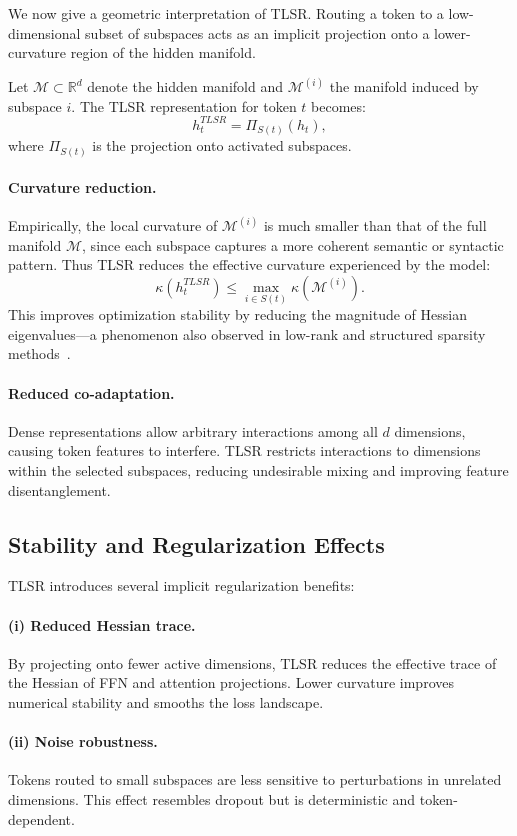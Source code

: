 \documentclass{article}
\theoremstyle{plain}
\theoremstyle{definition}
\theoremstyle{remark}
\begin{document}
We now give a geometric interpretation of TLSR.
Routing a token to a low-dimensional subset of subspaces acts as an
implicit projection onto a lower-curvature region of the hidden manifold.

Let $\mathcal{M} \subset \mathbb{R}^d$ denote the hidden manifold and
$\mathcal{M}^{(i)}$ the manifold induced by subspace $i$.
The TLSR representation for token $t$ becomes:
\[
h_t^{TLSR} = \Pi_{S(t)}(h_t),
\]
where $\Pi_{S(t)}$ is the projection onto activated subspaces.

\paragraph{Curvature reduction.}
Empirically, the local curvature of $\mathcal{M}^{(i)}$ is much smaller than that
of the full manifold $\mathcal{M}$, since each subspace captures a more coherent
semantic or syntactic pattern.
Thus TLSR reduces the effective curvature experienced by the model:
\[
\kappa(h_t^{TLSR}) \le \max_{i \in S(t)} \kappa(\mathcal{M}^{(i)}).
\]
This improves optimization stability by reducing the magnitude of
Hessian eigenvalues—a phenomenon also observed in low-rank
and structured sparsity methods~\cite{fang2024maskllm,zheng2024readme}.

\paragraph{Reduced co-adaptation.}
Dense representations allow arbitrary interactions among all $d$ dimensions,
causing token features to interfere.
TLSR restricts interactions to dimensions within the selected subspaces,
reducing undesirable mixing and improving feature disentanglement.

\subsection{Stability and Regularization Effects}

TLSR introduces several implicit regularization benefits:

\paragraph{(i) Reduced Hessian trace.}
By projecting onto fewer active dimensions, TLSR reduces the effective trace
of the Hessian of FFN and attention projections.
Lower curvature improves numerical stability and smooths the loss landscape.

\paragraph{(ii) Noise robustness.}
Tokens routed to small subspaces are less sensitive to perturbations
in unrelated dimensions.
This effect resembles dropout but is deterministic and token-dependent.
\end{document}
